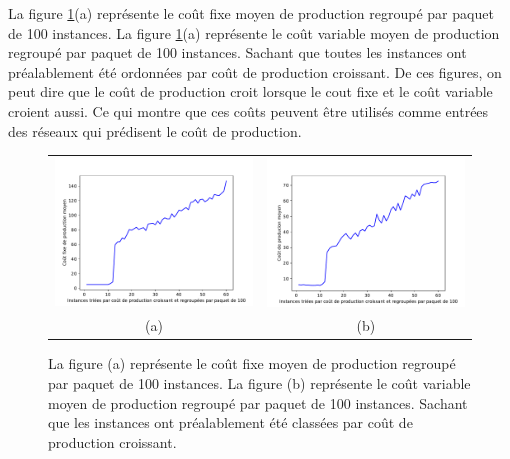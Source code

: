 La figure \ref{6000_cout}(a) représente le coût fixe moyen de production regroupé par paquet de 100 instances. La figure \ref{6000_cout}(a) représente le coût variable moyen de production regroupé par paquet de 100 instances. Sachant que toutes les instances ont préalablement été ordonnées par coût de production croissant. De ces figures, on peut dire que le coût de production croit lorsque le cout fixe et le coût variable croient aussi. Ce qui montre que ces coûts peuvent être utilisés comme entrées des réseaux qui prédisent le coût de production.
\begin{figure}[H]
	\centering
	\begin{tabular}{c c}
		\includegraphics[width=9cm]{images_these/Stats_instances_coutfix.pdf} &
		\includegraphics[width=9cm]{images_these/Stats_instances_cout_var.pdf}
		\\
		(a) & (b)
	\end{tabular}
	\caption[Coût fixe moyen et coût variable moyen de production regroupé par paquet de 100 instances]{La figure (a) représente le coût fixe moyen de production regroupé par paquet de 100 instances. La figure (b) représente le coût variable moyen de production regroupé par paquet de 100 instances. Sachant que les instances ont préalablement été classées par coût de production croissant.}\label{6000_cout}
\end{figure}


